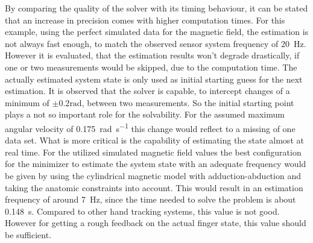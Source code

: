 By comparing the quality of the solver with its timing behaviour, it can be stated that an increase in precision comes with higher computation times. For this example, using the perfect simulated data for the magnetic field, the estimation is not always fast enough, to match the observed sensor system frequency of \SI{20}{\Hz}. However it is evaluated, that the estimation results won't degrade drastically, if one or two measurements would be skipped, due to the computation time. The actually estimated system state is only used as initial starting guess for the next estimation. It is observed that the solver is capable, to intercept changes of a minimum of $ \pm 0.2 \si{\radian} $, between two measurements. So the initial starting point plays a not so important role for the solvability. For the assumed maximum angular velocity of \SI[per-mode=symbol]{0.175}{\radian \per \second} this change would reflect to a missing of one data set. What is more critical is the capability of estimating the state almost at real time. For the utilized simulated magnetic field values the best configuration for the minimizer to estimate the system state with an adequate frequency would be given by using the cylindrical magnetic model with adduction-abduction and taking the anatomic constraints into account. This would result in an estimation frequency of around \SI{7}{\Hz}, since the time needed to solve the problem is about \SI{0.148}{\second}. Compared to other hand tracking systems, this value is not good. However for getting a rough feedback on the actual finger state, this value should be sufficient.
